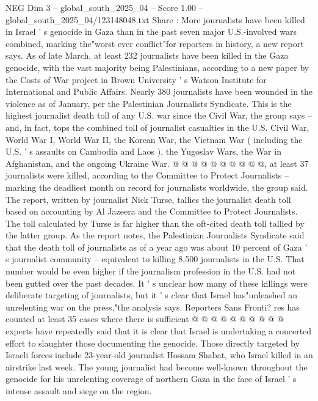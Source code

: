 \begin{textsample}{NEG Dim 3 – global\_south\_2025\_04 – Score 1.00 – global\_south\_2025\_04/123148048.txt}  \label{ex:f3_neg_345}
Share : More journalists have been killed in Israel ' s genocide in Gaza than in the past seven major U.S.-involved wars combined, marking the"worst ever conflict"for reporters in history, a new report says.
As of late March, at least 232 journalists have been killed in the Gaza genocide, with the vast majority being Palestinians, according to a new paper by the Costs of War project in Brown University ' s Watson Institute for International and Public Affairs.
Nearly 380 journalists have been wounded in the violence as of January, per the Palestinian Journalists Syndicate.
This is the highest journalist death toll of any U.S. war since the Civil War, the group says -- and, in fact, tops the combined toll of journalist casualties in the U.S.
Civil War, World War I, World War II, the Korean War, the Vietnam War ( including the U.S. ' s assaults on Cambodia and Laos ), the Yugoslav Wars, the War in Afghanistan, and the ongoing Ukraine War. @ @ @ @ @ @ @ @ @ @, at least 37 journalists were killed, according to the Committee to Protect Journalists -- marking the deadliest month on record for journalists worldwide, the group said.
The report, written by journalist Nick Turse, tallies the journalist death toll based on accounting by Al Jazeera and the Committee to Protect Journalists.
The toll calculated by Turse is far higher than the oft-cited death toll tallied by the latter group.
As the report notes, the Palestinian Journalists Syndicate said that the death toll of journalists as of a year ago was about 10 percent of Gaza ' s journalist community -- equivalent to killing 8,500 journalists in the U.S.
That number would be even higher if the journalism profession in the U.S. had not been gutted over the past decades.
It ' s unclear how many of these killings were deliberate targeting of journalists, but it ' s clear that Israel has"unleashed an unrelenting war on the press,"the analysis says.
Reporters Sans Fronti? res has counted at least 35 cases where there is sufficient @ @ @ @ @ @ @ @ @ @ experts have repeatedly said that it is clear that Israel is undertaking a concerted effort to slaughter those documenting the genocide.
Those directly targeted by Israeli forces include 23-year-old journalist Hossam Shabat, who Israel killed in an airstrike last week.
The young journalist had become well-known throughout the genocide for his unrelenting coverage of northern Gaza in the face of Israel ' s intense assault and siege on the region.

\end{textsample}
